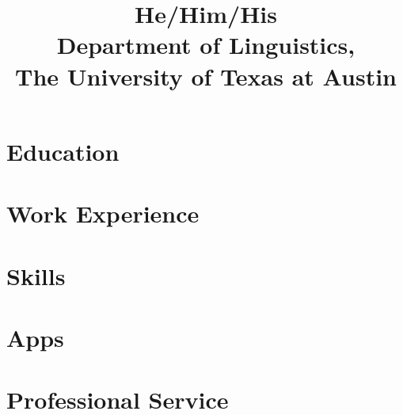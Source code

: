 \documentclass[11pt,a4paper]{mycv}
\title{He/Him/His\\Department of Linguistics,\\The University of Texas at Austin}
\begin{document}
\makecvtitle

\section{Education}


\vspace{0.5mm}

\section{Work Experience}


\begingroup
\setlength\bibitemsep{0.5ex}
\printbibliography[title=Select papers, nottype=unpublished]
\endgroup

\section{Skills}


\section{Apps}


\section{Professional Service}

\end{document}
